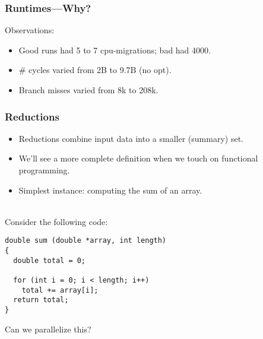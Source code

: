 \begin{frame}[containsverbatim]
  \frametitle{Runtimes---Why?}

  
    Observations:\\[1em]
    \begin{itemize}
    \item Good runs had 5 to 7 cpu-migrations; bad had 4000.
    \item \# cycles varied from 2B to 9.7B (no opt).\\
    \item Branch misses varied from 8k to 208k.
    \end{itemize}
  
    

    


        
    
\end{frame}

\begin{frame}[fragile]
  \frametitle{Reductions}


  \begin{itemize}
    \item Reductions combine input data into a smaller (summary) set.
    \item We'll see a more complete definition when we touch on functional
      programming.
    \item Simplest instance: computing the sum of an array.
  \end{itemize}
~\\

  Consider the following code:

  \begin{lstlisting}
double sum (double *array, int length)
{
  double total = 0;

  for (int i = 0; i < length; i++)
    total += array[i];
  return total;
}
  \end{lstlisting}

  Can we parallelize this? 

\end{frame}

